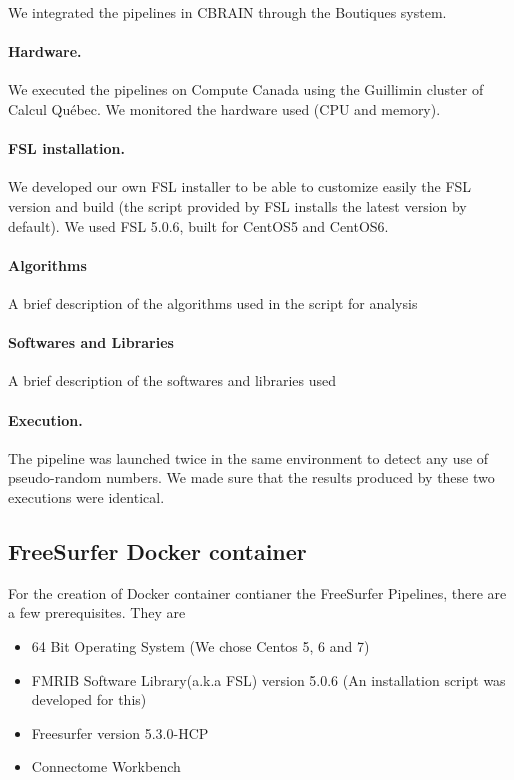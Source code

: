 \documentclass{article}
\begin{document}
We integrated the pipelines in CBRAIN through the Boutiques system.

\paragraph{Hardware.} We executed the pipelines on Compute Canada
using the Guillimin cluster of Calcul Qu\'ebec. We monitored the
hardware used (CPU and memory). 

\paragraph{FSL installation.} We developed our own FSL installer to be
able to customize easily the FSL version and build (the script
provided by FSL installs the latest version by default). We used FSL
5.0.6, built for CentOS5 and CentOS6.

\paragraph{Algorithms}
A brief description of the algorithms used in the script for analysis

\paragraph{Softwares and Libraries}
A brief description of the softwares and libraries used

\paragraph{Execution.} The pipeline was launched twice in the same
environment to detect any use of pseudo-random numbers. We
made sure that the results produced by these two executions were
identical.

\subsection{FreeSurfer Docker container}

For the creation of Docker container contianer the FreeSurfer Pipelines, there are a few prerequisites. They are

\begin{itemize}
  \item 64 Bit Operating System (We chose Centos 5, 6 and 7)
  \item FMRIB Software Library(a.k.a FSL) version 5.0.6 (An installation script was developed for this)
  \item Freesurfer version 5.3.0-HCP
  \item Connectome Workbench
\end{itemize}
\end{document}
